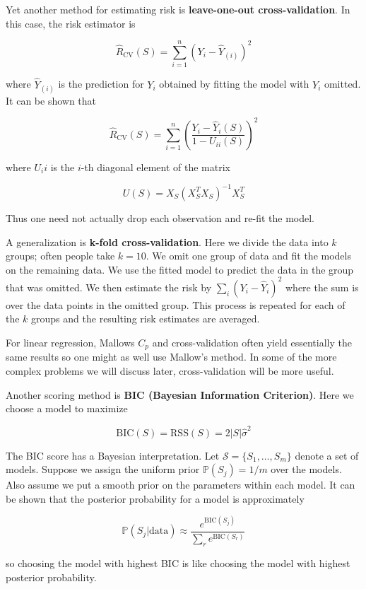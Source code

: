 Yet another method for estimating risk is \textbf{leave-one-out
cross-validation}. In this case, the risk estimator is

\[\hat{R}_\text{CV}(S) = \sum_{i=1}^{n} (Y_{i} - \hat{Y}_{(i)})^{2} \]

where \(\hat{Y}_{(i)}\) is the prediction for \(Y_{i}\) obtained by
fitting the model with \(Y_{i}\) omitted. It can be shown that

\[\hat{R}_\text{CV}(S) = \sum_{i=1}^{n} \left( \frac{Y_{i} - \hat{Y}_{i}(S)}{1 - U_{ii}(S)} \right)^{2} \]

where \(U_{i}i\) is the \(i\)-th diagonal element of the matrix

\[U(S) = X_S (X_S^T X_S)^{-1} X_S^T\]

Thus one need not actually drop each observation and re-fit the model.

A generalization is \textbf{k-fold cross-validation}. Here we divide the
data into \(k\) groups; often people take \(k = 10\). We omit one group
of data and fit the models on the remaining data. We use the fitted
model to predict the data in the group that was omitted. We then
estimate the risk by \(\sum_{i} (Y_{i} - \hat{Y}_{i})^{2}\) where the sum is
over the data points in the omitted group. This process is repeated for
each of the \(k\) groups and the resulting risk estimates are averaged.

For linear regression, Mallows \(C_p\) and cross-validation often yield
essentially the same results so one might as well use Mallow's method.
In some of the more complex problems we will discuss later,
cross-validation will be more useful.

Another scoring method is \textbf{BIC (Bayesian Information Criterion)}.
Here we choose a model to maximize

\[ \text{BIC}(S) = \text{RSS}(S) = 2 |S| \hat{\sigma}^{2} \]

The BIC score has a Bayesian interpretation. Let
\(\mathcal{S} = \{ S_{1}, \dots, S_m \}\) denote a set of models. Suppose
we assign the uniform prior \(\mathbb{P}(S_{j}) = 1 / m\) over the models.
Also assume we put a smooth prior on the parameters within each model.
It can be shown that the posterior probability for a model is
approximately

\[ \mathbb{P}(S_{j} | \text{data}) \approx \frac{e^{\text{BIC}(S_{j})}}{\sum_r e^{\text{BIC}(S_r)}}\]

so choosing the model with highest BIC is like choosing the model with
highest posterior probability.

